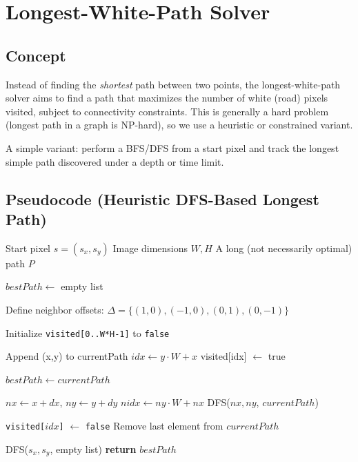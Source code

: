 \documentclass[11pt]{article}
\begin{document}
\section{Longest-White-Path Solver}
\label{sec:longest_white}

\subsection{Concept}

Instead of finding the \emph{shortest} path between two points, the
longest-white-path solver aims to find a path that maximizes the number
of white (road) pixels visited, subject to connectivity constraints.
This is generally a hard problem (longest path in a graph is NP-hard),
so we use a heuristic or constrained variant.

A simple variant: perform a BFS/DFS from a start pixel and track the
longest simple path discovered under a depth or time limit.

\subsection{Pseudocode (Heuristic DFS-Based Longest Path)}

\begin{algorithm}[h!]
\caption{Heuristic Longest-White-Path Solver}
\begin{algorithmic}[1]
\Require Start pixel $s = (s_x,s_y)$
\Require Image dimensions $W,H$
\Ensure A long (not necessarily optimal) path $P$

\State $bestPath \gets$ empty list

\State Define neighbor offsets:
\State \hspace{1em} $\Delta = \{(1,0),(-1,0),(0,1),(0,-1)\}$

\State Initialize \texttt{visited[0..W*H-1]} to \texttt{false}

    \State Append (x,y) to currentPath
    \State $idx \gets y \cdot W + x$
    \State visited[idx] $\gets$ true

    \State $bestPath \gets currentPath$
  \EndIf

    \State $nx \gets x + dx$, $ny \gets y + dy$
      \State $nidx \gets ny \cdot W + nx$
        \State DFS($nx,ny$, $currentPath$)
      \EndIf
    \EndIf
  \EndFor

  \State \texttt{visited[$idx$]} $\gets$ \texttt{false}
  \State Remove last element from $currentPath$
\EndFunction

\State DFS($s_x,s_y$, empty list)
\State \textbf{return} $bestPath$
\end{algorithmic}
\end{algorithm}
\end{document}
